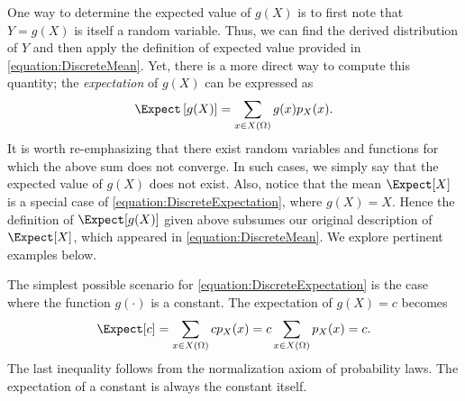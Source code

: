 One way to determine the expected value of $g(X)$ is to first note that $Y = g(X)$ is itself a random variable.
Thus, we can find the derived distribution of $Y$ and then apply the definition of expected value provided in \eqref{equation:DiscreteMean}.
Yet, there is a more direct way to compute this quantity;
the \emph{expectation} of $g(X)$ can be expressed as 
\begin{equation} \label{equation:DiscreteExpectation}
\Expect \left[ g(X) \right]
= \sum_{x \in X(\Omega)} g(x) p_X (x) .
\end{equation}
It is worth re-emphasizing that there exist random variables and functions for which the above sum does not converge.
In such cases, we simply say that the expected value of $g(X)$ does not exist.
Also, notice that the mean $\Expect [X]$ is a special case of \eqref{equation:DiscreteExpectation}, where $g(X) = X$.
Hence the definition of $\Expect [g(X)]$ given above subsumes our original description of $\Expect [X]$, which appeared in \eqref{equation:DiscreteMean}.
We explore pertinent examples below.

\begin{example}
The simplest possible scenario for \eqref{equation:DiscreteExpectation} is the case where the function $g(\cdot)$ is a constant.
The expectation of $g(X) = c$ becomes
\begin{equation*}
\Expect [ c ]
= \sum_{x \in X(\Omega)} c p_X (x)
= c \sum_{x \in X(\Omega)} p_X (x)
= c .
\end{equation*}
The last inequality follows from the normalization axiom of probability laws.
The expectation of a constant is always the constant itself.
\end{example}

